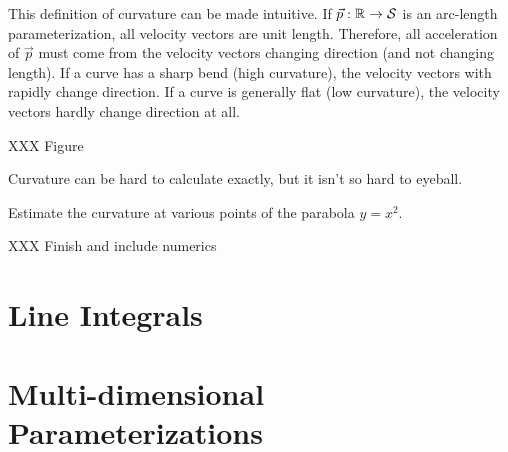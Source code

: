 This definition of curvature can be made intuitive.  If $\vec p:\mathbb{R}\to\mathcal S$ is an arc-length parameterization,
all velocity vectors are unit length.  Therefore, all acceleration of $\vec p$ must come from
the velocity vectors changing direction (and not changing length).  If a curve has a sharp bend (high curvature),
the velocity vectors with rapidly change direction.  If a curve is generally flat (low curvature),
the velocity vectors hardly change direction at all.

XXX Figure

Curvature can be hard to calculate exactly, but it isn't so hard to eyeball.

\begin{example}
	Estimate the curvature at various points of the parabola $y=x^2$.

	XXX Finish and include numerics
\end{example}

\begin{exercises}
\end{exercises}

\section{Line Integrals}

\section{Multi-dimensional Parameterizations}
